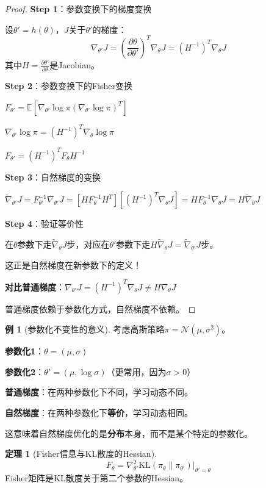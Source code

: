 \documentclass[11pt,a4paper]{article}
\theoremstyle{definition}
\newtheorem{example}{例}[section]
\newtheorem{theorem}{定理}[section]
\begin{document}
\begin{proof}
\textbf{Step 1}：参数变换下的梯度变换

设$\theta' = h(\theta)$，$J$关于$\theta'$的梯度：
\[
\nabla_{\theta'} J = \left(\frac{\partial \theta}{\partial \theta'}\right)^T \nabla_\theta J = (H^{-1})^T \nabla_\theta J
\]
其中$H = \frac{\partial \theta'}{\partial \theta}$是Jacobian。

\textbf{Step 2}：参数变换下的Fisher变换

$F_{\theta'} = \mathbb{E}[\nabla_{\theta'} \log \pi (\nabla_{\theta'} \log \pi)^T]$

$\nabla_{\theta'} \log \pi = (H^{-1})^T \nabla_\theta \log \pi$

$F_{\theta'} = (H^{-1})^T F_\theta H^{-1}$

\textbf{Step 3}：自然梯度的变换

$\tilde{\nabla}_{\theta'} J = F_{\theta'}^{-1} \nabla_{\theta'} J = [H F_\theta^{-1} H^T][(H^{-1})^T \nabla_\theta J] = H F_\theta^{-1} \nabla_\theta J = H \tilde{\nabla}_\theta J$

\textbf{Step 4}：验证等价性

在$\theta$参数下走$\tilde{\nabla}_\theta J$步，对应在$\theta'$参数下走$H \tilde{\nabla}_\theta J = \tilde{\nabla}_{\theta'} J$步。

这正是自然梯度在新参数下的定义！

\textbf{对比普通梯度}：$\nabla_{\theta'} J = (H^{-1})^T \nabla_\theta J \neq H \nabla_\theta J$

普通梯度依赖于参数化方式，自然梯度不依赖。
\end{proof}

\begin{example}[参数化不变性的意义]
考虑高斯策略$\pi = \mathcal{N}(\mu, \sigma^2)$。

\textbf{参数化1}：$\theta = (\mu, \sigma)$

\textbf{参数化2}：$\theta' = (\mu, \log\sigma)$（更常用，因为$\sigma > 0$）

\textbf{普通梯度}：在两种参数化下不同，学习动态不同。

\textbf{自然梯度}：在两种参数化下\textbf{等价}，学习动态相同。

这意味着自然梯度优化的是\textbf{分布}本身，而不是某个特定的参数化。
\end{example}

\begin{theorem}[Fisher信息与KL散度的Hessian]
\[
F_\theta = \nabla^2_{\theta'} \text{KL}(\pi_\theta \| \pi_{\theta'}) \big|_{\theta'=\theta}
\]
Fisher矩阵是KL散度关于第二个参数的Hessian。
\end{theorem}
\end{document}

